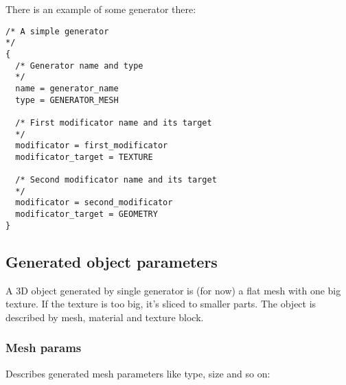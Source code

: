 \documentclass[9pt]{article}
\begin{document}
There is an example of some generator there: 

\begin{verbatim}
/* A simple generator
*/
{
  /* Generator name and type
  */
  name = generator_name
  type = GENERATOR_MESH

  /* First modificator name and its target
  */
  modificator = first_modificator
  modificator_target = TEXTURE
  
  /* Second modificator name and its target
  */
  modificator = second_modificator
  modificator_target = GEOMETRY
}
\end{verbatim}

\subsection{Generated object parameters}

A 3D object generated by single generator is (for now) a flat mesh with
one big texture. If the texture is too big, it's sliced to smaller parts.
The object is described by mesh, material and texture block.

\subsubsection{Mesh params}

Describes generated mesh parameters like type, size and so on:
\end{document}
